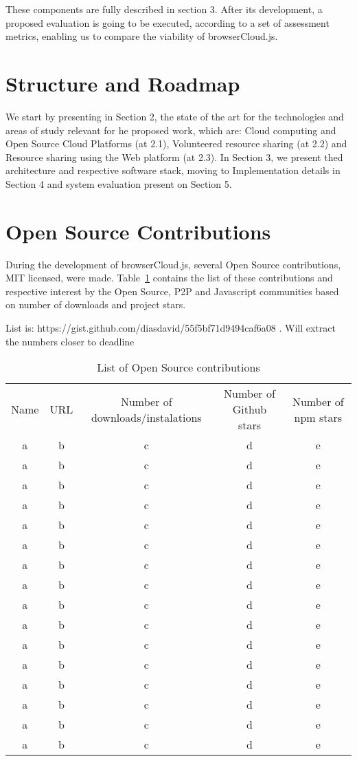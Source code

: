 These components are fully described in section 3. After its development, a proposed evaluation is going to be executed, according to a set of assessment metrics, enabling us to compare the viability of browserCloud.js.

\section{Structure and Roadmap}

We start by presenting in Section 2, the state of the art for the technologies and areas of study relevant for he proposed work, which are: Cloud computing and Open Source Cloud Platforms (at 2.1), Volunteered resource sharing (at 2.2) and Resource sharing using the Web platform (at 2.3). In Section 3, we present thed architecture and respective software stack, moving to Implementation details in Section 4 and system evaluation present on Section 5.

\section{Open Source Contributions}

During the development of browserCloud.js, several Open Source contributions, MIT licensed, were made. Table~\ref{tbl:codecontributions} contains the list of these contributions and respective interest by the Open Source, P2P and Javascript communities based on number of downloads and project stars.

List is: https://gist.github.com/diasdavid/55f5bf71d9494caf6a08 . Will extract the numbers closer to deadline

\begin{table}
  \centering
  \begin{tabular}{| c | c | c | c | c |}
  \hline 
  Name & URL & Number of downloads/instalations & Number of Github stars & Number of npm stars  \\
  a & b & c & d & e \\
  a & b & c & d & e \\
  a & b & c & d & e \\
  a & b & c & d & e \\
  a & b & c & d & e \\
  a & b & c & d & e \\
  a & b & c & d & e \\
  a & b & c & d & e \\
  a & b & c & d & e \\
  a & b & c & d & e \\
  a & b & c & d & e \\
  a & b & c & d & e \\
  a & b & c & d & e \\
  a & b & c & d & e \\
  a & b & c & d & e \\
  a & b & c & d & e \\
  \hline   
  \end{tabular}
  \caption{List of Open Source contributions}
  \label{tbl:codecontributions}
\end{table}


